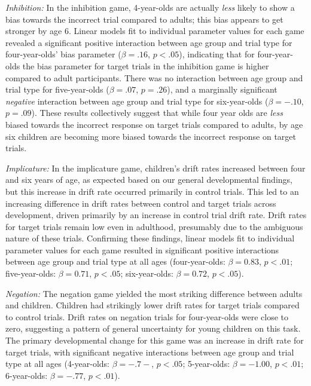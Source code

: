 \documentclass[10pt,letterpaper]{article}
\begin{document}
\emph{Inhibition:} In the inhibition game, 4-year-olds are actually \emph{less} likely to show a bias towards the incorrect trial compared to adults; this bias appears to get stronger by age 6.  Linear models fit to individual parameter values for each game revealed a significant positive interaction between age group and trial type for four-year-olds' bias parameter ($\beta = .16$, $p< .05$), indicating that for four-year-olds the bias parameter for target trials in the inhibition game is higher compared to adult participants.  There was no interaction between age group and trial type for five-year-olds ($\beta = .07$, $p = .26$), and a marginally significant \emph{negative} interaction between age group and trial type for six-year-olds ($\beta = -.10$, $p = .09$).  These results collectively suggest that while four year olds are \emph{less} biased towards the incorrect response on target trials compared to adults, by age six children are becoming more biased towards the incorrect response on target trials.  

\emph{Implicature:} In the implicature game, children's drift rates increased between four and six years of age, as expected based on our general developmental findings, but this increase in drift rate occurred primarily in control trials.  This led to an increasing difference in drift rates between control and target trials across development, driven primarily by an increase in control trial drift rate.  Drift rates for target trials remain low even in adulthood, presumably due to the ambiguous nature of these trials.  Confirming these findings, linear models fit to individual parameter values for each game resulted in significant positive interactions between age group and trial type at all ages (four-year-olds: $\beta = 0.83$, $p <.01$; five-year-olds: $\beta = 0.71$, $p <.05$; six-year-olds: $\beta = 0.72$, $p <.05$).

\emph{Negation:}  The negation game yielded the most striking difference between adults and children.  Children had strikingly lower drift rates for target trials compared to control trials.  Drift rates on negation trials for four-year-olds were close to zero, suggesting a pattern of general uncertainty for young children on this task.  The primary developmental change for this game was an increase in drift rate for target trials, with significant negative interactions between age group and trial type at all ages (4-year-olds: $\beta = -.7-$, $p <.05$; 5-year-olds: $\beta = -1.00$, $p <.01$; 6-year-olds: $\beta = -.77$, $p <.01$).  
\end{document}
